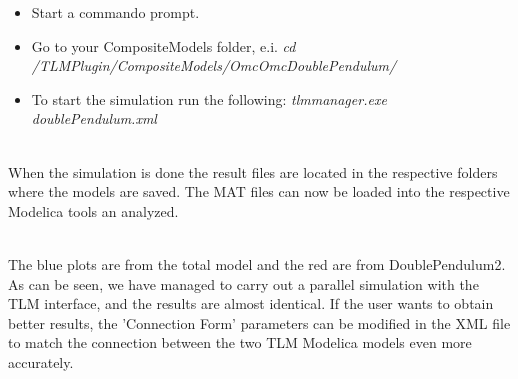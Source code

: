 \begin{itemize}
  \item Start a commando prompt.
  \item Go to your CompositeModels folder, e.i. 
\textit{cd /TLMPlugin/CompositeModels/OmcOmcDoublePendulum/}
  \item To start the simulation run the following: \textit{tlmmanager.exe doublePendulum.xml}
\end{itemize}

~\\When the simulation is done the result files are located in the respective folders where the models are saved. 
The MAT files can now be loaded into the respective Modelica tools an analyzed.

~\\The blue plots are from the total model and the red are from DoublePendulum2. 
As can be seen, we have managed to carry out a parallel simulation with the TLM interface, and the results are almost identical. 
If the user wants to obtain better results, the 'Connection Form' parameters can be modified in the XML file to match the connection between the two TLM Modelica models even more accurately.

